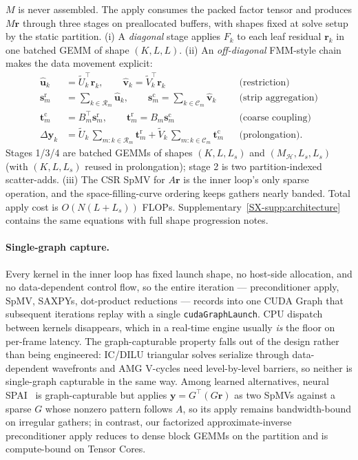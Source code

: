 \documentclass[acmtog]{acmart}
\theoremstyle{plain}
\begin{document}
$M$ is never assembled. The apply consumes the packed factor tensor and produces $M\mathbf{r}$
through three stages on preallocated buffers, with shapes fixed at solve setup by the static
partition. (i) A \emph{diagonal} stage applies $F_k$ to each leaf residual $\mathbf{r}_k$ in
one batched GEMM of shape $(K,L,L)$. (ii) An \emph{off-diagonal} FMM-style chain makes the
data movement explicit:
\begin{align}
  \hat{\mathbf{u}}_k &= \tilde U_k^\top\mathbf{r}_k,\qquad
  \hat{\mathbf{v}}_k = \tilde V_k^\top\mathbf{r}_k && \text{(restriction)} \\
  \mathbf{s}^{\mathrm{r}}_m &= \sum_{k\in\mathcal{R}_m}\hat{\mathbf{u}}_k,\qquad
  \mathbf{s}^{\mathrm{c}}_m = \sum_{k\in\mathcal{C}_m}\hat{\mathbf{v}}_k
  && \text{(strip aggregation)} \\
  \mathbf{t}^{\mathrm{c}}_m &= B_m^\top\mathbf{s}^{\mathrm{r}}_m,\qquad
  \mathbf{t}^{\mathrm{r}}_m = B_m\mathbf{s}^{\mathrm{c}}_m && \text{(coarse coupling)} \\
  \Delta\mathbf{y}_k &= \tilde U_k\,{\textstyle\sum_{m:k\in\mathcal{R}_m}\!\mathbf{t}^{\mathrm{r}}_m}
                    +  \tilde V_k\,{\textstyle\sum_{m:k\in\mathcal{C}_m}\!\mathbf{t}^{\mathrm{c}}_m}
  && \text{(prolongation).}
\end{align}
Stages 1/3/4 are batched GEMMs of shapes $(K,L,L_s)$ and
$(M_{\mathcal{H}},L_s,L_s)$ (with $(K,L,L_s)$ reused in prolongation);
stage 2 is two partition-indexed scatter-adds. (iii) The CSR SpMV for $A\mathbf{r}$ is the
inner loop's only sparse operation, and the space-filling-curve ordering keeps gathers nearly
banded. Total apply cost is $O(N(L+L_s))$ FLOPs. Supplementary~\ref{SX-supp:architecture}
contains the same equations with full shape progression notes.

\paragraph{Single-graph capture.}
Every kernel in the inner loop has fixed launch shape, no host-side allocation, and no
data-dependent control flow, so the entire iteration --- preconditioner apply, SpMV,
SAXPYs, dot-product reductions --- records into one CUDA Graph that subsequent iterations
replay with a single \verb|cudaGraphLaunch|. CPU dispatch between kernels disappears,
which in a real-time engine usually \emph{is} the floor on per-frame latency. The
graph-capturable property falls out of the design rather than being engineered:
IC/DILU triangular solves serialize through data-dependent wavefronts and AMG V-cycles
need level-by-level barriers, so neither is single-graph capturable in the same way.
Among learned alternatives, neural SPAI~\cite{Yang2025sparse} is graph-capturable but
applies $\mathbf{y}\!=\!G^\top(G\mathbf{r})$ as two SpMVs against a sparse $G$ whose
nonzero pattern follows $A$, so its apply remains bandwidth-bound on irregular gathers;
in contrast, our factorized approximate-inverse preconditioner apply reduces to dense
block GEMMs on the partition and is compute-bound on Tensor Cores.
\end{document}
